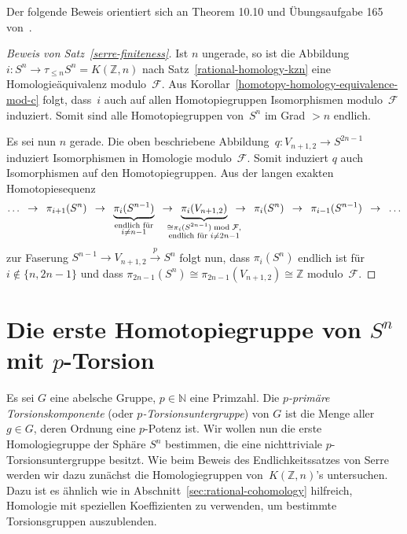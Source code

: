 \documentclass[11pt, a4paper, german]{article}
\theoremstyle{definition}
\theoremstyle{remark}
\newcommand{\R}{\mathbb{R}} %
\newcommand{\N}{\mathbb{N}} %
\newcommand{\Z}{\mathbb{Z}} %
\newcommand{\F}{\mathcal{F}} %
\newcommand{\V}[2]{V_{{#2},{#1}}} %
\begin{document}
Der folgende Beweis orientiert sich an Theorem 10.10 und Übungsaufgabe 165 von~\cite{davis-kirk:at}.

\begin{proof}[Beweis von Satz~\ref{serre-finiteness}]
  Ist $n$ ungerade, so ist die Abbildung $i : S^n \to \tau_{\leq n} S^n = K(\Z, n)$ nach Satz~\ref{rational-homology-kzn} eine Homologieäquivalenz modulo~$\F$.
  Aus Korollar~\ref{homotopy-homology-equivalence-mod-c} folgt, dass~$i$ auch auf allen Homotopiegruppen Isomorphismen modulo~$\F$ induziert.
  Somit sind alle Homotopiegruppen von~$S^n$ im Grad $> n$ endlich.

  Es sei nun $n$ gerade.
  Die oben beschriebene Abbildung~$q : \V{2}{n+1} \to S^{2n-1}$ induziert Isomorphismen in Homologie modulo~$\F$.
  Somit induziert $q$ auch Isomorphismen auf den Homotopiegruppen.
  Aus der langen exakten Homotopiesequenz
  \[
    \ldots
    \enspace\to\enspace
    \pi_{i+1}(S^n)
    \enspace\to\enspace
    \underbrace{\pi_i(S^{n-1})}_{\substack{\text{endlich für} \\ i \neq n-1}}
    \enspace\to\enspace \underbrace{\pi_i(\V{2}{n+1})}_{\mathclap{\substack{\cong \pi_i(S^{2n-1}) \bmod{\F}, \\ \text{endlich für } i \neq 2n-1}}}
    \enspace\to\enspace
    \pi_i(S^n)
    \enspace\to\enspace
    \pi_{i-1}(S^{n-1})
    \enspace\to\enspace
    \ldots
  \]
  zur Faserung $S^{n-1} \to \V{2}{n+1} \xrightarrow{p} S^n$ folgt nun, dass $\pi_i(S^n)$ endlich ist für $i \not\in \{ n, 2n-1 \}$ und dass $\pi_{2n-1}(S^n) \cong \pi_{2n-1}(\V{2}{n+1}) \cong \Z$ modulo~$\F$.
\end{proof}

\section{Die erste Homotopiegruppe von $S^n$ mit $p$-Torsion}

Es sei $G$ eine abelsche Gruppe, $p \in \N$ eine Primzahl.
Die \emph{$p$-primäre Torsionskomponente} (oder \emph{$p$-Torsionsuntergruppe}) von $G$ ist die Menge aller $g \in G$, deren Ordnung eine $p$-Potenz ist.
Wir wollen nun die erste Homologiegruppe der Sphäre $S^n$ bestimmen, die eine nichttriviale $p$-Torsionsuntergruppe besitzt.
Wie beim Beweis des Endlichkeitssatzes von Serre werden wir dazu zunächst die Homologiegruppen von~$K(\Z, n)$'s untersuchen.
Dazu ist es ähnlich wie in Abschnitt~\ref{sec:rational-cohomology} hilfreich, Homologie mit speziellen Koeffizienten zu verwenden, um bestimmte Torsionsgruppen auszublenden.
\end{document}
